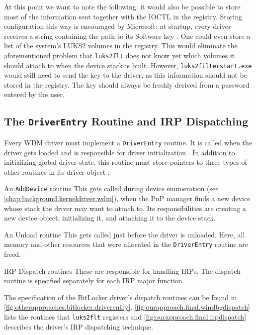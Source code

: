 At this point we want to note the following: it would also be possible to store most of the information sent together with the IOCTL in the registry. Storing configuration this way is encouraged by Microsoft: at startup, every driver receives a string containing the path to its Software key \cite{Wdk}. One could even store a list of the system's LUKS2 volumes in the registry. This would eliminate the aforementioned problem that \texttt{luks2flt} does not know yet which volumes it should attach to when the device stack is built. However, \texttt{luks2filterstart.exe} would still need to send the key to the driver, as this information should not be stored in the registry. The key should always be freshly derived from a password entered by the user.

\subsection{The \texttt{DriverEntry} Routine and IRP Dispatching}
\label{chap:ourapproach.final.genericdispatch}
Every WDM driver must implement a \texttt{DriverEntry} routine. It is called when the driver gets loaded and is responsible for driver initialization \cite{Wdk}. In addition to initializing global driver state, this routine must store pointers to three types of other routines in its driver object \cite{Kerneldriver}:
\begin{descitemize}
	\item[An \texttt{AddDevice} routine] This gets called during device enumeration (see \autoref{chap:background.kerneldriver.wdm}), when the PnP manager finds a new device whose stack the driver may want to attach to. Its responsibilities are creating a new device object, initializing it, and attaching it to the device stack.
	\item[An Unload routine] This gets called just before the driver is unloaded. Here, all memory and other resources that were allocated in the \texttt{DriverEntry} routine are freed.
	\item[IRP Dispatch routines] These are responsible for handling IRPs. The dispatch routine is specified separately for each IRP major function.
\end{descitemize}

The specification of the BitLocker driver's dispatch routines can be found in \autoref{fig:otherapproaches.bitlocker.driverentry}. \autoref{fig:ourapproach.final.windbgdispatch} lists the routines that \texttt{luks2flt} registers and \autoref{fig:ourapproach.final.irpdispatch} describes the driver's IRP dispatching technique.

